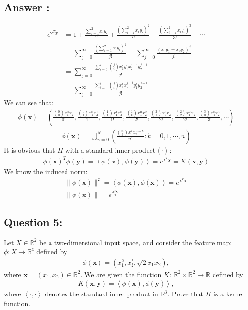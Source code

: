 \documentclass[a4paper,12pt]{article}
\newcommand{\R}{\mathbb{R}}
\begin{document}
\subsection*{Answer :}
\begin{align*}
    e^{\bm{x}^T\bm{y}} &= 1 + \frac{\sum_{i=1}^{2}x_iy_i}{1!} + \frac{(\sum_{i=1}^{2}x_iy_i)^2}{2!} + \frac{(\sum_{i=1}^{2}x_iy_i)^3}{3!} + \cdots \\
    &= \sum_{j=0}^{\infty}\frac {(\sum_{i=1}^{2}x_iy_i)^j} {j!} = \sum_{j=0}^{\infty}\frac {(x_1y_1 + x_2y_2)^j} {j!}  \\
    &= \sum_{j=0}^{\infty} \frac {\sum_{i=0}^{j}\binom ji x_1^iy_1^ix_2^{j-i}y_2^{j-i}} {j!} \\
    &= \sum_{j=0}^{\infty} \frac {\sum_{i=0}^{j}\binom ji x_1^ix_2^{j-i}y_1^iy_2^{j-i}} {j!}
\end{align*}
We can see that:
\begin{align*}
    \phi(\bm{x}) = \left(\frac {\binom{0}{0} x_1^0x_2^0}{0!} , \frac {\binom{1}{0} x_1^0x_2^1}{1!} , \frac {\binom{1}{1} x_1^1x_2^0}{1!} , \frac {\binom{2}{0} x_1^0x_2^2}{2!} , \frac {\binom{2}{1} x_1^1x_2^1}{2!} , \frac {\binom{2}{2} x_1^2x_2^0}{2!} , \frac {\binom{3}{0} x_1^0x_2^3}{3!} , \cdots\right)
\end{align*}
\begin{align*}
    \phi(\bm{x}) = \bigcup_{n = 0}^{N}(\frac {\binom{n}{k} x_1^kx_2^{n-k}} {n!} :k=0, 1, \cdots, n)
\end{align*}
It is obvious that \(H\) with a standard inner product\(\left<\cdot\right>\):
\begin{align*}
    \phi(\bm{x})^T\phi(\bm{y}) = \left<\phi(\bm{x}), \phi(\bm{y})\right> = e^{\bm{x}^T\bm{y}} = K(\bm{x}, \bm{y})
\end{align*}
We know the induced norm:
\begin{align*}
    \|\phi(\bm{x})\|^2 = \left<\phi(\bm{x}), \phi(\bm{x})\right> = e^{\bm{x}^T\bm{x}}   \\
    \|\phi(\bm{x})\| = e^{\frac {\bm{x}^T\bm{x}} 2}
\end{align*}

\subsection*{Question 5:}
Let \(X \in \R^2\) be a two-dimensional input space, and consider the feature map: \(\phi: X \to \R^3\) defined by
\begin{align*}
    \phi(\bm{x}) = (x_1^2, x_2^2, \sqrt 2 x_1x_2),
\end{align*}
where \(\bm{x} = (x_1, x_2) \in \R^2\). We are given the function \(K\): \(\R^2 \times \R^2 \to \R\) defined by
\begin{align*}
    K(\bm{x}, \bm{y}) = \left< \phi(\bm{x}), \phi(\bm{y})\right>,
\end{align*}
where \(\left<\cdot , \cdot\right>\) denotes the standard inner product in \(\R^3\). Prove that \(K\) is a kernel function.
\end{document}
